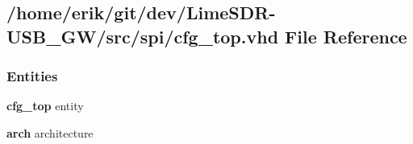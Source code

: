 \subsection{/home/erik/git/dev/\+Lime\+S\+D\+R-\/\+U\+S\+B\+\_\+\+G\+W/src/spi/cfg\+\_\+top.vhd File Reference}
\label{cfg__top_8vhd}
\subsubsection*{Entities}
\begin{DoxyCompactItemize}
\item 
{\bf cfg\+\_\+top} entity
\item 
{\bf arch} architecture
\end{DoxyCompactItemize}
